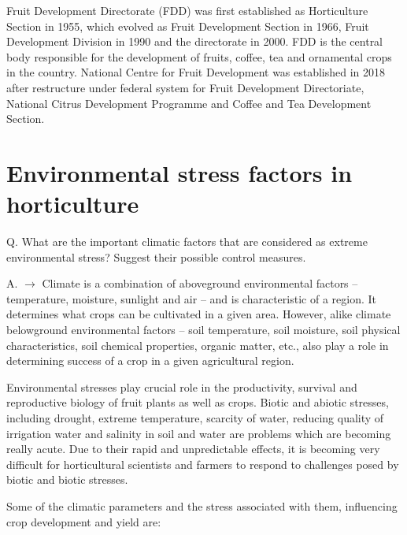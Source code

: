 \documentclass[
]{book}
\begin{document}
Fruit Development Directorate (FDD) was first established as Horticulture Section in 1955, which evolved as Fruit Development Section in 1966, Fruit Development Division in 1990 and the directorate in 2000. FDD is the central body responsible for the development of fruits, coffee, tea and ornamental crops in the country. National Centre for Fruit Development was established in 2018 after restructure under federal system for Fruit Development Directoriate, National Citrus Development Programme and Coffee and Tea Development Section.

\hypertarget{environmental-stress-factors-in-horticulture}{%
\section{Environmental stress factors in horticulture}\label{environmental-stress-factors-in-horticulture}}

Q. What are the important climatic factors that are considered as extreme environmental stress? Suggest their possible control measures.

A. \(\longrightarrow\) Climate is a combination of aboveground environmental factors -- temperature, moisture, sunlight and air -- and is characteristic of a region. It determines what crops can be cultivated in a given area. However, alike climate belowground environmental factors -- soil temperature, soil moisture, soil physical characteristics, soil chemical properties, organic matter, etc., also play a role in determining success of a crop in a given agricultural region.

Environmental stresses play crucial role in the productivity, survival and reproductive biology of fruit plants as well as crops. Biotic and abiotic stresses, including drought, extreme temperature, scarcity of water, reducing quality of irrigation water and salinity in soil and water are problems which are becoming really acute. Due to their rapid and unpredictable effects, it is becoming very difficult for horticultural scientists and farmers to respond to challenges posed by biotic and biotic stresses.

Some of the climatic parameters and the stress associated with them, influencing crop development and yield are:
\end{document}
